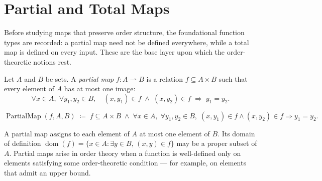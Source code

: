
\section{Partial and Total Maps}
\label{sec:partial-total-maps}

\begin{tcolorbox}[
  colback=gray!6,
  colframe=gray!40,
  arc=2pt,
  left=8pt, right=8pt, top=6pt, bottom=6pt,
  title={\small\textbf{Toolkit: Partial and Total Maps}},
  fonttitle=\small\bfseries
]
Before studying maps that preserve order structure, the foundational
function types are recorded: a partial map need not be defined everywhere,
while a total map is defined on every input.  These are the base layer
upon which the order-theoretic notions rest.
\end{tcolorbox}


\begin{tcolorbox}[colback=defbox, colframe=defborder, arc=2pt,
  left=6pt, right=6pt, top=4pt, bottom=4pt,
  title={\small\textbf{Definition (Partial Map)}},
  fonttitle=\small\bfseries]
\begin{definition}
\label{def:partial-map}
Let $A$ and $B$ be sets.  A \emph{partial map} $f : A \rightharpoonup B$
is a relation $f \subseteq A \times B$ such that every element of $A$ has
at most one image:
\[
\forall x \in A,\; \forall y_1, y_2 \in B,\quad
(x, y_1) \in f \;\land\; (x, y_2) \in f
\;\Longrightarrow\; y_1 = y_2.
\]
\end{definition}
\end{tcolorbox}

\begin{remark*}
\[
\operatorname{PartialMap}(f, A, B)
\;\coloneqq\;
f \subseteq A \times B
\;\land\;
\forall x \in A,\; \forall y_1, y_2 \in B,\;
(x,y_1) \in f \land (x,y_2) \in f \Rightarrow y_1 = y_2.
\]
\end{remark*}

\begin{remark*}[Interpretation]
A partial map assigns to each element of $A$ at most one element of $B$.
Its domain of definition
$\operatorname{dom}(f) = \{x \in A : \exists y \in B,\, (x,y) \in f\}$
may be a proper subset of $A$.  Partial maps arise in order theory when
a function is well-defined only on elements satisfying some order-theoretic
condition — for example, on elements that admit an upper bound.
\end{remark*}

